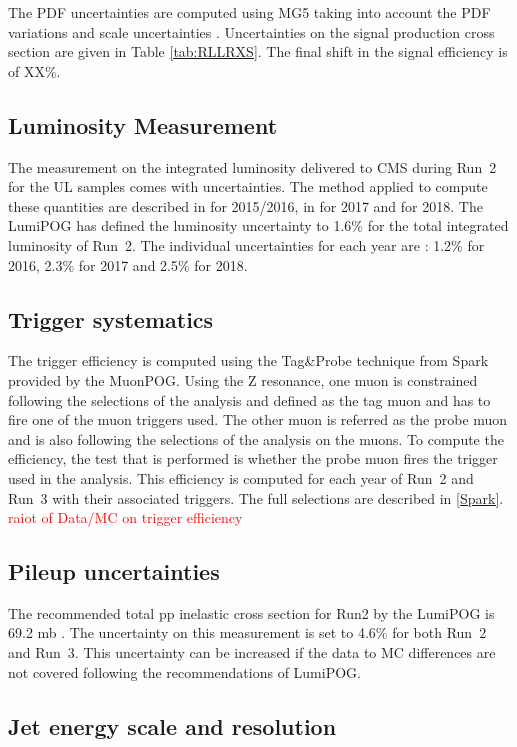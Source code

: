 \documentclass{cernatlasnote}
\begin{document}
        The PDF uncertainties are computed using MG5 taking into account the PDF variations and scale uncertainties \cite{HowToPDF}.
        Uncertainties on the signal production cross section are given in Table \ref{tab:RLLRXS}. The final shift in the signal efficiency is of XX\%.
    \pagebreak
    \subsection{Luminosity Measurement}
        The measurement on the integrated luminosity delivered to CMS during Run~2 for the UL samples comes with uncertainties. The method applied to compute these quantities are described in \cite{Sirunyan_2021} for 2015/2016, in \cite{CMS:LUM-17-004} for 2017 and \cite{CMS-PAS-LUM-18-002} for 2018. The LumiPOG has defined the luminosity uncertainty to 1.6\% for the total integrated luminosity of Run~2. The individual uncertainties for each year are : 1.2\% for 2016, 2.3\% for 2017 and 2.5\% for 2018.
    \pagebreak
    \subsection{Trigger systematics}
        The trigger efficiency is computed using the Tag\&Probe technique from Spark provided by the MuonPOG. Using the Z resonance, one muon is constrained following the selections of the analysis and defined as the tag muon and has to fire one of the muon triggers used. The other muon is referred as the probe muon and is also following the selections of the analysis on the muons. To compute the efficiency, the test that is performed is whether the probe muon fires the trigger used in the analysis. This efficiency is computed for each year of Run~2 and Run~3 with their associated triggers. The full selections are described in \ref{Spark}. \textcolor{red}{raiot of Data/MC on trigger efficiency}
    \pagebreak
    \subsection{Pileup uncertainties}
        The recommended total pp inelastic cross section for Run2 by the LumiPOG is 69.2 mb \cite{PileupSystematicErrors}. The uncertainty on this measurement is set to 4.6\% for both Run~2 and Run~3. This uncertainty can be increased if the data to MC differences are not covered following the recommendations of LumiPOG.
    \pagebreak
    \subsection{Jet energy scale and resolution}
\end{document}
